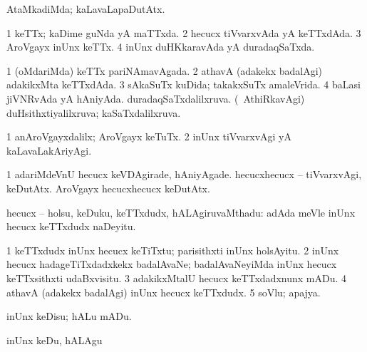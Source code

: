 {{{{{{\begin{center}
\bentry
{} 
\gl{\kirxvi}
\expl{}
\bmng
AtaMkadiMda; kaLavaLapaDutAtx. 
\emng
\eentry

\bentry
{} 
\gl{\nA}
\expl{}
\bmng
{} 
\emng
\eentry

\bentry
{} 
\gl{\gu}
\expl{}
\bmng
\bnum
\num{1} keTTx; kaDime guNda yA maTTxda. 
\num{2} hecucx tiVvarxvAda yA keTTxdAda. 
\num{3} AroVgayx inUnx keTTx. 
\num{4} inUnx duHKkaravAda yA duradaqSaTxda. 
\enum
\emng

\noindent
\gl{\pagu}
\expl{}
\bmng
\bnum
\num{1}  (oMdariMda) keTTx pariNAmavAgada. 
\num{2}  athavA (adakekx badalAgi) adakikxMta keTTxdAda. 
\num{3}  sAkaSuTx kuDida; takakxSuTx amaleVrida. 
\num{4}  baLasi jiVNRvAda yA hAniyAda. 
  
\banum
{} duradaqSaTxdalilxruva. 
 (\kanmu\ AthiRkavAgi) duHsithxtiyalilxruva; kaSaTxdalilxruva. 
\eanum
\numie
\enum
\emng
\eentry

\bentry
{} 
\gl{\kirxvi}
\expl{}
\bmng
\bnum
\num{1} anAroVgayxdalilx; AroVgayx keTuTx. 
\num{2} inUnx tiVvarxvAgi yA kaLavaLakAriyAgi. 
\enum
\emng

\noindent
\gl{\pagu}
\expl{}
\bmng
\bnum
\num{1}  adariMdeVnU hecucx keVDAgirade, hAniyAgade. 
\banum
{} hecucxhecucx -- tiVvarxvAgi, keDutAtx. 
 AroVgayx hecucxhecucx keDutAtx. 
\eanum
\numie
\enum
\emng
\eentry

\bentry
{} 
\gl{\nA}
\expl{}
\bmng
hecucx -- holsu, keDuku, keTTxdudx, hALAgiruvaMthadu:  adAda meVle inUnx hecucx keTTxdudx naDeyitu. 
\emng

\noindent
\gl{\pagu}
\expl{}
\bmng
\bnum
\num{1}  keTTxdudx inUnx hecucx keTiTxtu; parisithxti inUnx holsAyitu. 
\num{2}  inUnx hecucx hadageTiTxdadxkekx badalAvaNe; badalAvaNeyiMda inUnx hecucx keTTxsithxti udaBxvisitu. 
\num{3}  adakikxMtalU hecucx keTTxdadxnunx mADu. 
\num{4} athavA (adakekx badalAgi) inUnx hecucx keTTxdudx. 
\num{5}  soVlu; apajya. 
\enum
\emng
\eentry

\bentry
{} 
\gl{\sakirx}
\expl{}
\bmng
inUnx keDisu; hALu mADu. 
\emng

\noindent
\gl{\akirx}
\expl{}
\bmng
inUnx keDu, hALAgu 
\emng
\eentry


\end{center}}}}}}}
